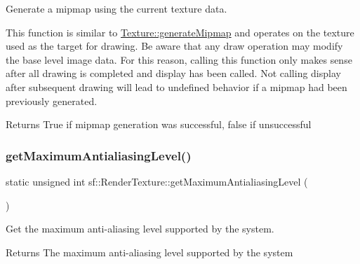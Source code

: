 Generate a mipmap using the current texture data. 

This function is similar to \mbox{\hyperlink{classsf_1_1_texture_a7779a75c0324b5faff77602f871710a9}{Texture\+::generate\+Mipmap}} and operates on the texture used as the target for drawing. Be aware that any draw operation may modify the base level image data. For this reason, calling this function only makes sense after all drawing is completed and display has been called. Not calling display after subsequent drawing will lead to undefined behavior if a mipmap had been previously generated.

\begin{DoxyReturn}{Returns}
True if mipmap generation was successful, false if unsuccessful \begin{DoxyVerb}\end{DoxyVerb}
 
\end{DoxyReturn}
\mbox{\label{classsf_1_1_render_texture_ab0849fc3e064b744ffae1ab1d85ee12b}} 
\subsubsection{\texorpdfstring{getMaximumAntialiasingLevel()}{getMaximumAntialiasingLevel()}}
{\footnotesize\ttfamily static unsigned int sf\+::\+Render\+Texture\+::get\+Maximum\+Antialiasing\+Level (\begin{DoxyParamCaption}{ }\end{DoxyParamCaption})\hspace{0.3cm}{\ttfamily [static]}}



Get the maximum anti-\/aliasing level supported by the system. 

\begin{DoxyReturn}{Returns}
The maximum anti-\/aliasing level supported by the system \begin{DoxyVerb}\end{DoxyVerb}
 
\end{DoxyReturn}
\mbox{\label{classsf_1_1_render_texture_a6685315b5c4c25a5dcb75b4280b381ba}} 
